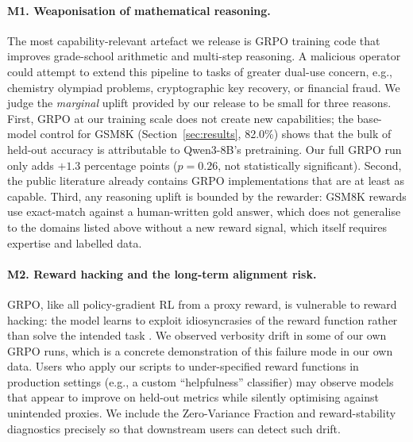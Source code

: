 \documentclass{article}
\begin{document}
\paragraph{M1. Weaponisation of mathematical reasoning.}
The most capability-relevant artefact we release is GRPO training code that
improves grade-school arithmetic and multi-step reasoning. A malicious
operator could attempt to extend this pipeline to tasks of greater
dual-use concern, e.g., chemistry olympiad problems, cryptographic key
recovery, or financial fraud. We judge the \emph{marginal} uplift provided
by our release to be small for three reasons. First, GRPO at our training
scale does not create new capabilities; the base-model control for GSM8K
(Section~\ref{sec:results}, 82.0\%) shows that the bulk of held-out
accuracy is attributable to Qwen3-8B's pretraining. Our full GRPO run only
adds \(+1.3\) percentage points ($p{=}0.26$, not statistically significant).
Second, the public literature already contains GRPO implementations
\cite{shao2024deepseekmath, openrlhf2024, verl2024, trl2020} that are at
least as capable. Third, any reasoning uplift is bounded by the rewarder:
GSM8K rewards use exact-match against a human-written gold answer, which
does not generalise to the domains listed above without a new reward
signal, which itself requires expertise and labelled data.

\paragraph{M2. Reward hacking and the long-term alignment risk.}
GRPO, like all policy-gradient RL from a proxy reward, is vulnerable to
reward hacking: the model learns to exploit idiosyncrasies of the reward
function rather than solve the intended task \cite{skalse2022specificationgaming,
krakovna2020specification}. We observed verbosity drift in some
of our own GRPO runs, which is a concrete demonstration of this failure
mode in our own data.
Users who apply our scripts to under-specified reward functions in
production settings (e.g., a custom ``helpfulness'' classifier) may observe
models that appear to improve on held-out metrics while silently
optimising against unintended proxies. We include the Zero-Variance
Fraction and reward-stability diagnostics precisely so that downstream
users can detect such drift.
\end{document}

